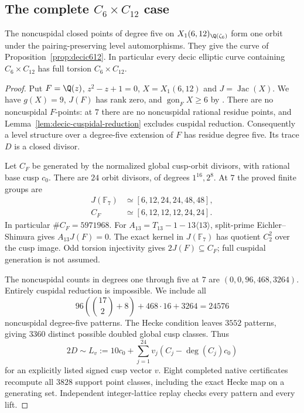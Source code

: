 \subsection{The complete \texorpdfstring{$C_6\times C_{12}$}{C6 x C12} case}
\begin{proposition}\label{prop:decic612-complete}
The noncuspidal closed points of degree five on
$X_1(6,12)_{\Q(\zeta_6)}$ form one orbit under the pairing-preserving
level automorphisms. They give the curve of Proposition~\ref{prop:decic612}.
In particular every decic elliptic curve containing
$C_6\times C_{12}$ has full torsion $C_6\times C_{12}$.
\end{proposition}
\begin{proof}
Put $F=\Q(z)$, $z^2-z+1=0$, $X=X_1(6,12)$ and
$J=\operatorname{Jac}(X)$. We have $g(X)=9$, $J(F)$ has rank zero,
and $\operatorname{gon}_F X\ge6$ by \cite{DS,NV}.
There are no noncuspidal $F$-points: at $7$ there are no
noncuspidal rational residue points, and
Lemma~\ref{lem:decic-cuspidal-reduction} excludes cuspidal reduction.
Consequently a level structure over a degree-five extension of $F$
has residue degree five. Its trace $D$ is a closed divisor.

Let $C_F$ be generated by the normalized global cusp-orbit divisors,
with rational base cusp $c_0$. There are $24$ orbit divisors,
of degrees $1^{16},2^8$. At $7$ the proved finite groups are
\[
\begin{aligned}
 J(\mathbb F_7)&\simeq[6,12,24,24,48,48],\\
 C_F&\simeq[6,12,12,12,24,24].
\end{aligned}
\]
In particular $\#C_F=5971968$.
For $A_{13}=T_{13}-1-13\langle13\rangle$, split-prime
Eichler--Shimura gives $A_{13}J(F)=0$.
The exact kernel in $J(\mathbb F_7)$ has quotient $C_2^2$
over the cusp image. Odd torsion injectivity gives
$2J(F)\subseteq C_F$; full cuspidal generation is not assumed.

The noncuspidal counts in degrees one through five at $7$ are
$(0,0,96,468,3264)$. Entirely cuspidal reduction is impossible.
We include all
\[
 96\left(\binom{17}{2}+8\right)+468\cdot16+3264=24576
\]
noncuspidal degree-five patterns.
The Hecke condition leaves $3552$ patterns, giving $3360$
distinct possible doubled global cusp classes. Thus
\[
 2D\sim L_v:=10c_0+\sum_{j=1}^{24}v_j(C_j-\deg(C_j)c_0)
\]
for an explicitly listed signed cusp vector $v$.
Eight completed native certificates recompute all $3828$ support
point classes, including the exact Hecke map on a generating set.
Independent integer-lattice replay checks every pattern and every lift.


\end{proof}
